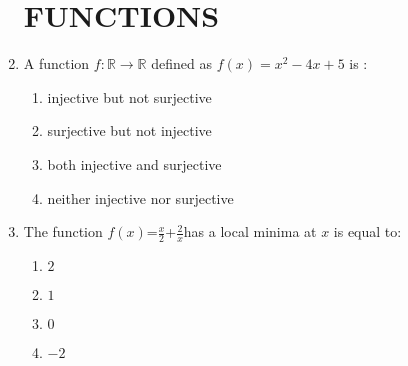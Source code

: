 \documentclass{article}
\begin{document}
				\begin{enumerate}
						\section{FUNCTIONS}
        \item A function $f :\mathbb{R} \rightarrow \mathbb{R}$ defined as $f(x) = x^2 - 4x +5 $ is :
                \begin{enumerate}[label=(\Alph*)]
                \item injective but not surjective
\item surjective but not injective
\item both injective and surjective
\item neither injective nor surjective
\end{enumerate}
\item The function $f(x)$=$\frac{x}{2}$+$\frac{2}{x}$has a local minima at $x$ is equal to:

        \begin{enumerate}[label=(\Alph*)]
                        \item$2$
                        \item$1$
                        \item$0$
                        \item$-2$
                \end{enumerate}
				\end{enumerate}
\end{document}
